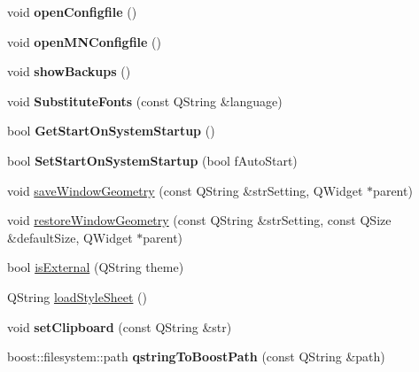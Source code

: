 \begin{DoxyCompactItemize}
void {\bfseries open\+Configfile} ()
\item 
\mbox{\label{namespace_g_u_i_util_a17cced42f0ebd5fb923eba61015308a8}} 
void {\bfseries open\+M\+N\+Configfile} ()
\item 
\mbox{\label{namespace_g_u_i_util_a16fd78c7608981cc405561a8d5e8d7e3}} 
void {\bfseries show\+Backups} ()
\item 
\mbox{\label{namespace_g_u_i_util_aa76f59ed024e930768abd3df71f9e353}} 
void {\bfseries Substitute\+Fonts} (const Q\+String \&language)
\item 
\mbox{\label{namespace_g_u_i_util_adca0cdbc1de324bc53c891bdcafa6513}} 
bool {\bfseries Get\+Start\+On\+System\+Startup} ()
\item 
\mbox{\label{namespace_g_u_i_util_a82afe76b9469d777217438a25ab7f95e}} 
bool {\bfseries Set\+Start\+On\+System\+Startup} (bool f\+Auto\+Start)
\item 
void \mbox{\hyperlink{namespace_g_u_i_util_a5bd5d67910917446f2f3aa97d7c8b85a}{save\+Window\+Geometry}} (const Q\+String \&str\+Setting, Q\+Widget $\ast$parent)
\item 
void \mbox{\hyperlink{namespace_g_u_i_util_aded16e1d178a93b809819884af8351db}{restore\+Window\+Geometry}} (const Q\+String \&str\+Setting, const Q\+Size \&default\+Size, Q\+Widget $\ast$parent)
\item 
bool \mbox{\hyperlink{namespace_g_u_i_util_a2e5ef5c3c42eeecfc616aeae7cba0488}{is\+External}} (Q\+String theme)
\item 
Q\+String \mbox{\hyperlink{namespace_g_u_i_util_a2e749681627868ac0f70c0c8aa1dcb32}{load\+Style\+Sheet}} ()
\item 
\mbox{\label{namespace_g_u_i_util_aef655b19f129179ca32f11a4d0da1a07}} 
void {\bfseries set\+Clipboard} (const Q\+String \&str)
\item 
\mbox{\label{namespace_g_u_i_util_a23e76d4663b416f0d59f0a8fe89b018c}} 
boost\+::filesystem\+::path {\bfseries qstring\+To\+Boost\+Path} (const Q\+String \&path)
\item 
\mbox{\label{namespace_g_u_i_util_a8bbd2bea6cbc55658e8496603d1fd564}} 

\end{DoxyCompactItemize}
